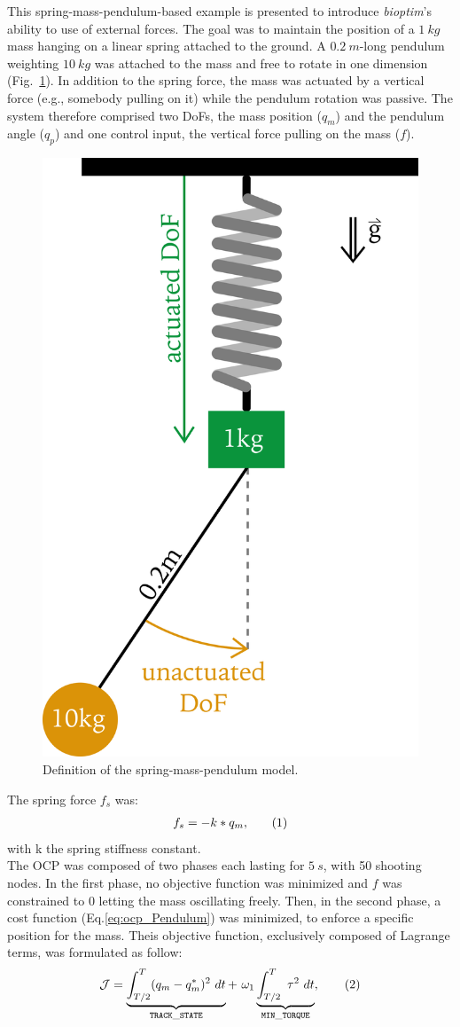 This spring-mass-pendulum-based example is presented to introduce \textit{bioptim}'s ability to use of external forces.
The goal was to maintain the position of a $\SI{1}{kg}$ mass hanging on a linear spring attached to the ground.
A $\SI{0.2}{m}$-long pendulum weighting $\SI{10}{kg}$ was attached to the mass and free to rotate in one dimension (Fig.~\ref{fig:Mass_Pendulum_Model}).
In addition to the spring force, the mass was actuated by a vertical force (e.g., somebody pulling on it) while the pendulum rotation was passive.
The system therefore comprised two DoFs, the mass position ($q_m$) and the pendulum angle ($q_p$) and one control input, the vertical force pulling on the mass ($f$). 
\begin{figure}[h!]
\centering
\includegraphics[width=0.35\columnwidth]{figures/Mass_Pendulum_Model.png}
\caption{Definition of the spring-mass-pendulum model.}
\label{fig:Mass_Pendulum_Model}
\end{figure}
The spring force $f_s$ was:
\[
\begin{aligned}
f_s = -k*q_m,
\end{aligned}
\addtag
\label{eq:f_ext}
\]
with k the spring stiffness constant.\\
The OCP was composed of two phases each lasting for $\SI{5}{s}$, with 50 shooting nodes.
In the first phase, no objective function was minimized and $f$ was constrained to $0$ letting the mass oscillating freely. 
Then, in the second phase, a cost function (Eq.\ref{eq:ocp_Pendulum}) was minimized, to enforce a specific position for the mass.
Theis objective function, exclusively composed of Lagrange terms, was formulated as follow:
\[
\mathcal{J} = \underbrace{\int_{T/2}^T (q_m - q_m^*)^2~dt}_{\mathtt{TRACK\_STATE}}  +~\omega_1 \underbrace{\int_{T/2}^T ~\tau^2~dt}_{\mathtt{MIN\_ TORQUE}},
\addtag
\label{eq:ocp_Pendulum}
\]

